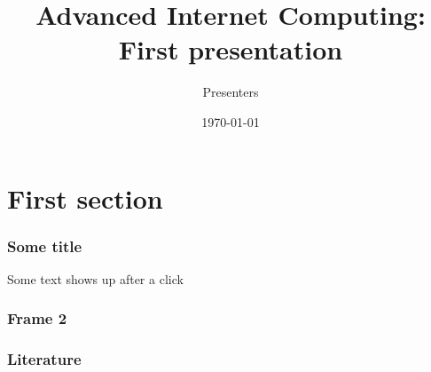 \documentclass{beamer}
\title{Advanced Internet Computing: First presentation}
\author{Presenters }
\date{\today}
\begin{document}
\frame{\titlepage}

\section{First section}
\begin{frame}
    \frametitle{Some title}
    Some text
    \pause
    shows up after a click
  \end{frame}
  
\begin{frame}
	\frametitle{Frame 2}
\end{frame}


\begin{frame}[allowframebreaks]
\frametitle<presentation>{Literature}    
 
\end{frame} 	 
\end{document}
